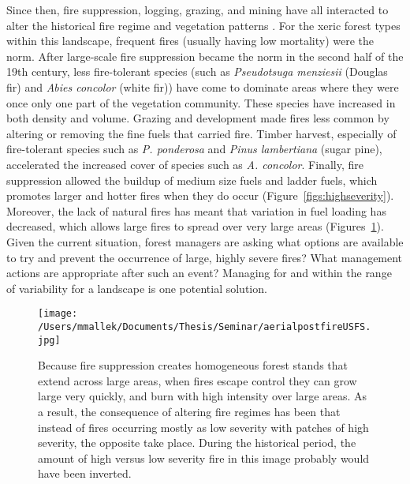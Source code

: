 Since then, fire suppression, logging, grazing, and mining have all interacted to alter the historical fire regime and vegetation patterns \citep{Stephens2015,Knapp2013}. For the xeric forest types within this landscape, frequent fires (usually having low mortality) were the norm. After large-scale fire suppression became the norm in the second half of the 19th century, less fire-tolerant species (such as \emph{Pseudotsuga menziesii} (Douglas fir) and \emph{Abies concolor} (white fir)) have come to dominate areas where they were once only one part of the vegetation community. These species have increased in both density and volume. Grazing and development made fires less common by altering or removing the fine fuels that carried fire. Timber harvest, especially of fire-tolerant species such as \emph{P. ponderosa} and \emph{Pinus lambertiana} (sugar pine), accelerated the increased cover of species such as \emph{A. concolor}. Finally, fire suppression allowed the buildup of medium size fuels and ladder fuels, which promotes larger and hotter fires when they do occur (Figure~\ref{figs:highseverity}). Moreover, the lack of natural fires has meant that variation in fuel loading has decreased, which allows large fires to spread over very large areas \citep{Hessburg2005,Beaty2007,Meyer2008} (Figures~\ref{fig:bigfirephoto}). Given the current situation, forest managers are asking what options are available to try and prevent the occurrence of large, highly severe fires? What management actions are appropriate after such an event? Managing for and within the range of variability for a landscape is one potential solution.


\begin{figure}[!htbp]
\centering
\texttt{[image: /Users/mmallek/Documents/Thesis/Seminar/aerialpostfireUSFS.jpg]}
\caption{Because fire suppression creates homogeneous forest stands that extend across large areas, when fires escape control they can grow large very quickly, and burn with high intensity over large areas. As a result, the consequence of altering fire regimes has been that instead of fires occurring mostly as low severity with patches of high severity, the opposite take place. During the historical period, the amount of high versus low severity fire in this image probably would have been inverted.}
\label{fig:bigfirephoto}
\end{figure}



\clearpage


